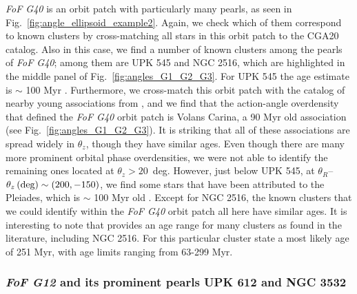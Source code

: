 \documentclass[twocolumn]{aastex631}
\begin{document}
\textit{FoF G40} is an orbit patch with particularly many pearls, as seen in Fig.~\ref{fig:angle_ellipsoid_example2}. Again, we check which of them correspond to known clusters by cross-matching all stars in this orbit patch to the CGA20 catalog. Also in this case, we find a number of known clusters among the pearls of \textit{FoF G40}; among them are UPK 545 and NGC 2516, which are highlighted in the middle panel of Fig.~\ref{fig:angles_G1_G2_G3}. For UPK 545 the age estimate is $\sim$ 100 Myr \citep{2019JKAS...52..145S}. Furthermore, we cross-match this orbit patch with the catalog of nearby young associations from \citet{2018ApJ...862..138G}, and we find that the action-angle overdensity that defined the \textit{FoF G40} orbit patch is Volans Carina, a 90 Myr old association \citep{2018ApJ...865..136G} (see Fig.~\ref{fig:angles_G1_G2_G3}). 
It is striking that all of these associations are spread widely in $\theta_{z}$, though they have similar ages. Even though there are many more prominent orbital phase overdensities, we were not able to identify the remaining ones located at $\theta_{z} > 20$~deg. However, just below UPK 545, at $\theta_{R}$--$\theta_{z}\,\rm{(deg)} \sim (200,-150)$, we find some stars that have been attributed to the Pleiades, which is $\sim$ 100 Myr old \citep{2018ApJ...863...67G}. Except for NGC 2516, the known clusters that we could identify within the \textit{FoF G40} orbit patch all here have similar ages. It is interesting to note that \citet{2021A&A...645A..84M} provides an age range for many clusters as found in the literature, including NGC 2516. For this particular cluster  \citet{2021A&A...645A..84M}  state a most likely age of 251 Myr, with age limits ranging from 63-299 Myr. 

\subsubsection{\textit{FoF G12} and its prominent pearls UPK 612 and NGC 3532}
\end{document}
